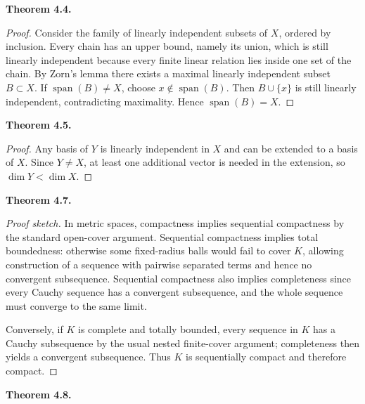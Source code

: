 \documentclass[11pt]{article}
\newenvironment{theoremstmt}[1]{%
  \par\medskip\noindent\textbf{Theorem #1. }\itshape
}{\par\medskip}
\begin{document}
\begin{theoremstmt}{4.4}
\thmHamelBasis
\end{theoremstmt}

\begin{proof}
Consider the family of linearly independent subsets of $X$, ordered by inclusion. Every chain has an upper bound, namely its union, which is still linearly independent because every finite linear relation lies inside one set of the chain. By Zorn's lemma there exists a maximal linearly independent subset $B\subset X$. If $\operatorname{span}(B)\neq X$, choose $x\notin\operatorname{span}(B)$. Then $B\cup\{x\}$ is still linearly independent, contradicting maximality. Hence $\operatorname{span}(B)=X$.
\end{proof}

\begin{theoremstmt}{4.5}
\thmProperSubspace
\end{theoremstmt}

\begin{proof}
Any basis of $Y$ is linearly independent in $X$ and can be extended to a basis of $X$. Since $Y\neq X$, at least one additional vector is needed in the extension, so $\dim Y<\dim X$.
\end{proof}

\begin{theoremstmt}{4.7}
\thmCompactEquivSequential
\end{theoremstmt}

\begin{proof}[Proof sketch]
In metric spaces, compactness implies sequential compactness by the standard open-cover argument. Sequential compactness implies total boundedness: otherwise some fixed-radius balls would fail to cover $K$, allowing construction of a sequence with pairwise separated terms and hence no convergent subsequence. Sequential compactness also implies completeness since every Cauchy sequence has a convergent subsequence, and the whole sequence must converge to the same limit.

Conversely, if $K$ is complete and totally bounded, every sequence in $K$ has a Cauchy subsequence by the usual nested finite-cover argument; completeness then yields a convergent subsequence. Thus $K$ is sequentially compact and therefore compact.
\end{proof}

\begin{theoremstmt}{4.8}
\thmUnitBallCompactIffFiniteDim
\end{theoremstmt}
\end{document}
